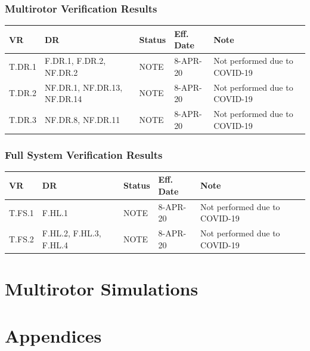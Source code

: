 \documentclass[10pt,letterpaper]{article}
\begin{document}
\subsubsection{Multirotor Verification Results}
\begin{table}[H]
	\centering
	\begin{tabular}{lllll}
	\hline
	\textbf{VR} & \textbf{DR} & \textbf{Status} & \textbf{Eff. Date} & \textbf{Note}\\
	\hline
        T.DR.1 & F.DR.1, F.DR.2, NF.DR.2 & NOTE & 8-APR-20 & Not performed due to COVID-19\\
        T.DR.2 & NF.DR.1, NF.DR.13, NF.DR.14 & NOTE   & 8-APR-20 & Not performed due to COVID-19\\
	T.DR.3 & NF.DR.8, NF.DR.11 & NOTE & 8-APR-20 & Not performed due to COVID-19\\
	\hline
	\end{tabular}
\end{table}

\subsubsection{Full System Verification Results}
\begin{table}[H]
	\centering
	\begin{tabular}{lllll}
	\hline
	\textbf{VR} & \textbf{DR} & \textbf{Status} & \textbf{Eff. Date} & \textbf{Note}\\
	\hline
        T.FS.1 & F.HL.1  & NOTE & 8-APR-20 & Not performed due to COVID-19\\
	T.FS.2 & F.HL.2, F.HL.3, F.HL.4 & NOTE & 8-APR-20 & Not performed due to COVID-19\\
	\hline
	\end{tabular}
\end{table}

\section{Multirotor Simulations}
\label{mr_sims}


\clearpage
{}



 \clearpage
 \appendix
 \section*{Appendices}
\end{document}
